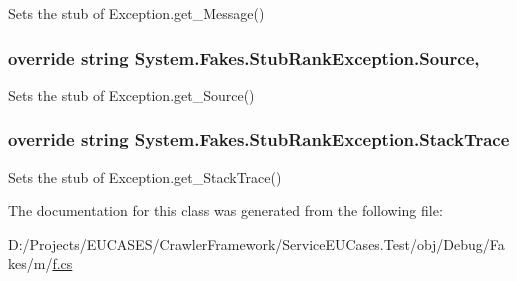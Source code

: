 Sets the stub of Exception.\-get\-\_\-\-Message()

\hypertarget{class_system_1_1_fakes_1_1_stub_rank_exception_ac5a2b6b8c7d6830db51b9bf8dd8af24a}{
\subsubsection[{Source}]{\setlength{\rightskip}{0pt plus 5cm}override string System.\-Fakes.\-Stub\-Rank\-Exception.\-Source\hspace{0.3cm}{\ttfamily [get]}, {\ttfamily [set]}}}\label{class_system_1_1_fakes_1_1_stub_rank_exception_ac5a2b6b8c7d6830db51b9bf8dd8af24a}


Sets the stub of Exception.\-get\-\_\-\-Source()

\hypertarget{class_system_1_1_fakes_1_1_stub_rank_exception_a14b77a1cf634edbdd898ed95e12e267b}{
\subsubsection[{Stack\-Trace}]{\setlength{\rightskip}{0pt plus 5cm}override string System.\-Fakes.\-Stub\-Rank\-Exception.\-Stack\-Trace\hspace{0.3cm}{\ttfamily [get]}}}\label{class_system_1_1_fakes_1_1_stub_rank_exception_a14b77a1cf634edbdd898ed95e12e267b}


Sets the stub of Exception.\-get\-\_\-\-Stack\-Trace()



The documentation for this class was generated from the following file\-:\begin{DoxyCompactItemize}
\item 
D\-:/\-Projects/\-E\-U\-C\-A\-S\-E\-S/\-Crawler\-Framework/\-Service\-E\-U\-Cases.\-Test/obj/\-Debug/\-Fakes/m/\hyperlink{m_2f_8cs}{f.\-cs}\end{DoxyCompactItemize}
